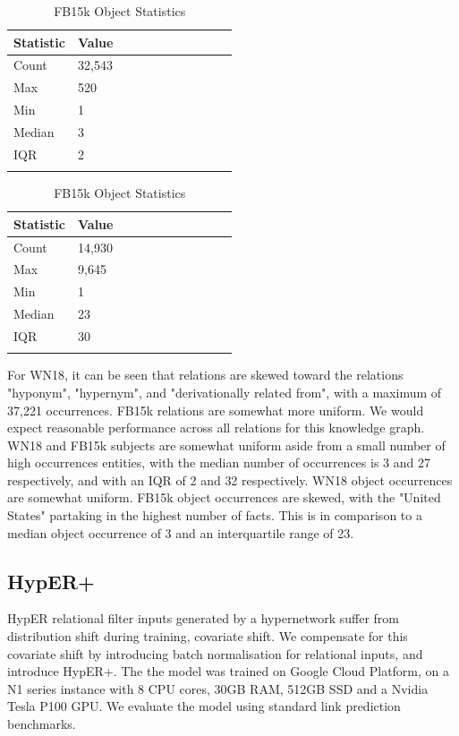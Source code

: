 \begin{table}[H]
	\parbox{.5\linewidth}{
		\centering
		\begin{tabular}{lllllllllll}
  			\textbf{Statistic} & \textbf{Value}  \\
  			\hline
			Count & 32,543 \\
			Max & 520 \\
			Min & 1 \\
  			Median & 3 \\
  			IQR & 2 \\
			&
		\end{tabular}
		\caption{WN18 Object Statistics}
		}
	\hfill
	\parbox{.5\linewidth}{
		\centering
		\begin{tabular}{lllllllllll}
  			\textbf{Statistic} & \textbf{Value}  \\
  			\hline
			Count & 14,930 \\
			Max & 9,645 \\
			Min & 1 \\
  			Median & 23 \\
  			IQR & 30 \\
			&
		\end{tabular}
		\caption{FB15k Object Statistics}
		}
\end{table}

\noindent For WN18, it can be seen that relations are skewed toward the relations "hyponym",  "hypernym", and "derivationally related from", with a maximum of 37,221 occurrences. FB15k relations are somewhat more uniform. We would expect reasonable performance across all relations for this knowledge graph. WN18 and FB15k subjects are somewhat uniform aside from a small number of high occurrences entities, with the median number of occurrences is 3 and 27 respectively, and with an IQR of 2 and 32 respectively. WN18 object occurrences are somewhat uniform. FB15k object occurrences are skewed, with the "United States" partaking in the highest number of facts. This is in comparison to a median object occurrence of 3 and an interquartile range of 23.



\subsection{HypER+}
HypER relational filter inputs generated by a hypernetwork suffer from distribution shift during training, covariate shift. We compensate for this covariate shift by introducing batch normalisation for relational inputs, and introduce HypER+. The the model was trained on Google Cloud Platform, on a N1 series instance with  8 CPU cores, 30GB RAM, 512GB SSD and a Nvidia Tesla P100 GPU. We evaluate the model using standard link prediction benchmarks. \par


